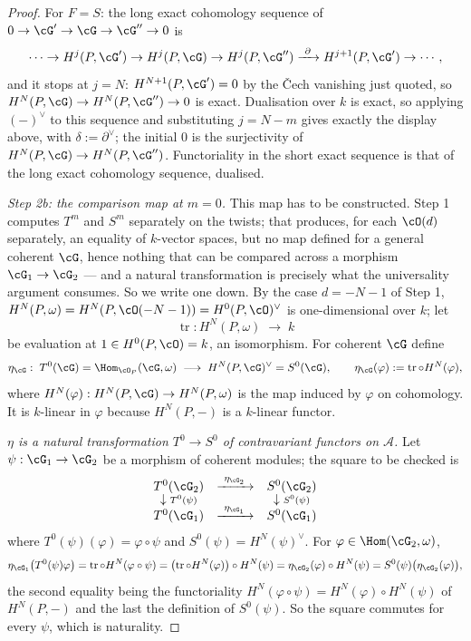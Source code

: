 \begin{proof}
For $F=S$: the long exact cohomology sequence of
$0\to\cG'\to\cG\to\cG''\to0$ is
\[
\cdots\to H^{j}(P,\cG')\to H^{j}(P,\cG)\to H^{j}(P,\cG'')
\xrightarrow{\ \partial\ }H^{j+1}(P,\cG')\to\cdots ,
\]
and it stops at $j=N$: $H^{N+1}(P,\cG')=0$ by the Čech vanishing just
quoted, so $H^N(P,\cG)\to H^N(P,\cG'')\to0$ is exact.  Dualisation
over $k$ is exact, so applying $(-)^{\vee}$ to this sequence and
substituting $j=N-m$ gives exactly the display above, with
$\delta:=\partial^{\vee}$; the initial $0$ is the surjectivity of
$H^N(P,\cG)\to H^N(P,\cG'')$.  Functoriality in the short exact
sequence is that of the long exact cohomology sequence, dualised.

\emph{Step 2b: the comparison map at $m=0$.}  This map has to be
constructed.  Step 1 computes $T^m$ and $S^m$ separately on the
twists; that produces, for each $\cO(d)$ separately, an equality of
$k$-vector spaces, but no map defined for a general coherent $\cG$,
hence nothing that can be compared across a morphism
$\cG_1\to\cG_2$ --- and a natural transformation is precisely what
the universality argument consumes.  So we write one down.  By the
case $d=-N-1$ of Step 1,
$H^N(P,\omega)=H^N(P,\cO(-N-1))=H^0(P,\cO)^{\vee}$ is
one-dimensional over $k$; let
\[
\operatorname{tr}:H^N(P,\omega)\;\longrightarrow\;k
\]
be evaluation at $1\in H^0(P,\cO)=k$, an isomorphism.  For coherent
$\cG$ define
\[
\eta_{\cG}:\;T^0(\cG)=\Hom_{\cO_P}(\cG,\omega)\;\longrightarrow\;
H^N(P,\cG)^{\vee}=S^0(\cG),
\qquad
\eta_{\cG}(\varphi):=\operatorname{tr}\circ H^N(\varphi),
\]
where $H^N(\varphi):H^N(P,\cG)\to H^N(P,\omega)$ is the map induced
by $\varphi$ on cohomology.  It is $k$-linear in $\varphi$ because
$H^N(P,-)$ is a $k$-linear functor.

\emph{$\eta$ is a natural transformation $T^0\to S^0$ of
contravariant functors on $\mathcal A$.}  Let $\psi:\cG_1\to\cG_2$ be
a morphism of coherent modules; the square to be checked is
\[
\begin{array}{ccc}
T^0(\cG_2) & \xrightarrow{\ \eta_{\cG_2}\ } & S^0(\cG_2)\\[-2pt]
\downarrow{\scriptstyle T^0(\psi)} & & \downarrow{\scriptstyle S^0(\psi)}\\[-2pt]
T^0(\cG_1) & \xrightarrow{\ \eta_{\cG_1}\ } & S^0(\cG_1)
\end{array}
\]
where $T^0(\psi)(\varphi)=\varphi\circ\psi$ and
$S^0(\psi)=H^N(\psi)^{\vee}$.  For $\varphi\in\Hom(\cG_2,\omega)$,
\[
\eta_{\cG_1}\bigl(T^0(\psi)\varphi\bigr)
=\operatorname{tr}\circ H^N(\varphi\circ\psi)
=\bigl(\operatorname{tr}\circ H^N(\varphi)\bigr)\circ H^N(\psi)
=\eta_{\cG_2}(\varphi)\circ H^N(\psi)
=S^0(\psi)\bigl(\eta_{\cG_2}(\varphi)\bigr),
\]
the second equality being the functoriality
$H^N(\varphi\circ\psi)=H^N(\varphi)\circ H^N(\psi)$ of $H^N(P,-)$ and
the last the definition of $S^0(\psi)$.  So the square commutes for
every $\psi$, which is naturality.


\end{proof}
